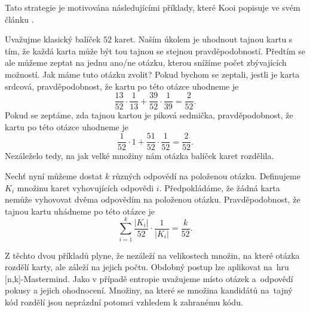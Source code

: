 Tato strategie je motivována následujícími příklady, které Kooi popisuje ve svém článku \cite{kooi}. 

\begin{prikl}\label{prdvecasti}
    Uvažujme klasický balíček $52$ karet. Naším úkolem je uhodnout tajnou kartu s tím, že každá karta může být tou tajnou se stejnou pravděpodobností. Předtím se ale můžeme zeptat na jednu ano/ne otázku, kterou snížíme počet zbývajících možností. Jak máme tuto otázku zvolit? 
    Pokud bychom se zeptali, jestli je karta srdcová, pravděpodobnost, že kartu po této otázce uhodneme je 
    \[\frac{13}{52} \cdot \frac{1}{13} + \frac{39}{52} \cdot \frac{1}{39} = \frac{2}{52}.\]
    Pokud se zeptáme, zda tajnou kartou je piková sedmička, pravděpodobnost, že kartu po této otázce uhodneme je 
     \[\frac{1}{52} \cdot 1 + \frac{51}{52} \cdot \frac{1}{52} = \frac{2}{52}.\] 
    Nezáleželo tedy, na jak velké množiny nám otázka balíček karet rozdělila. 
\end{prikl}\textbf{}

\begin{prikl}
    Nechť nyní můžeme dostat $k$ různých odpovědí na položenou otázku. Definujeme $K_i$ množinu karet vyhovujících odpovědi $i$. Předpokládáme, že žádná karta nemůže vyhovovat dvěma odpovědím na položenou otázku. Pravděpodobnost, že tajnou kartu uhádneme po této otázce je 
\[\sum_{i = 1}^k \frac{|K_i|}{52} \cdot \frac{1}{|K_i|} = \frac{k}{52}.\]
\end{prikl}


Z těchto dvou příkladů plyne, že nezáleží na velikostech množin, na které otázka rozdělí karty, ale záleží na jejich počtu. Obdobný postup lze aplikovat na~hru [n,k]-Mastermind. Jako v případě entropie uvažujeme místo otázek a~odpovědí pokusy a jejich ohodnocení. Množiny, na které se množina kandidátů na~tajný kód rozdělí jsou neprázdní potomci vzhledem k zahranému kódu. 











